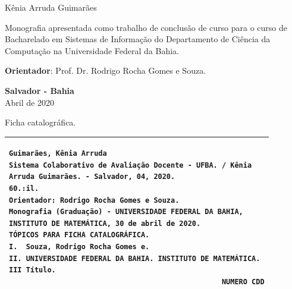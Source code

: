 \documentclass[12pt, a4paper]{report}
\begin{document}
\newpage
\begin{center}

\vspace{4cm}

\large{Kênia Arruda Guimarães}
\end{center}

\vspace{4cm}

\begin{flushright}
\begin{minipage}{8.6cm}
Monografia apresentada como trabalho de conclusão de curso para o curso de Bacharelado em Sistemas de Informação do Departamento de Ciência da Computação na Universidade Federal da Bahia.

\vspace{0.5cm}
\textbf{Orientador}: Prof. Dr. Rodrigo Rocha Gomes e Souza.

\end{minipage}
\end{flushright}
 
\vspace{6.95cm}

\begin{center}
\textbf{Salvador - Bahia} \\
Abril de 2020
\end{center}



\newpage
\thispagestyle{empty}
\null\vfill
                  
\begin{center}
 Ficha catalográfica.
\begin{tabular}{|p{13.5cm}|}%
\hline
\begin{small}
\begin{verbatim}
Guimarães, Kênia Arruda
Sistema Colaborativo de Avaliação Docente - UFBA. / Kênia
Arruda Guimarães. - Salvador, 04, 2020.
60.:il.
Orientador: Rodrigo Rocha Gomes e Souza.
Monografia (Graduação) - UNIVERSIDADE FEDERAL DA BAHIA,
INSTITUTO DE MATEMÁTICA, 30 de abril de 2020.
TÓPICOS PARA FICHA CATALOGRÁFICA.
I.  Souza, Rodrigo Rocha Gomes e. 
II. UNIVERSIDADE FEDERAL DA BAHIA. INSTITUTO DE MATEMÁTICA.
III Título.
                                                  NUMERO CDD
\end{verbatim}
\end{small}
\\ \hline
\end{tabular}
\end{center}
\end{document}
